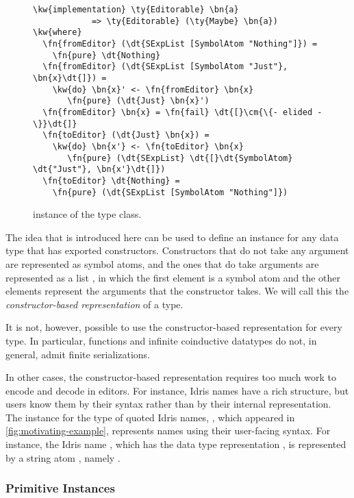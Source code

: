 \begin{figure}[H]
\begin{Verbatim}
\kw{implementation} \ty{Editorable} \bn{a}
            => \ty{Editorable} (\ty{Maybe} \bn{a}) \kw{where}
  \fn{fromEditor} (\dt{SExpList [SymbolAtom "Nothing"]}) =
    \fn{pure} \dt{Nothing}
  \fn{fromEditor} (\dt{SExpList [SymbolAtom "Just"}, \bn{x}\dt{]}) =
    \kw{do} \bn{x}' <- \fn{fromEditor} \bn{x}
       \fn{pure} (\dt{Just} \bn{x}')
  \fn{fromEditor} \bn{x} = \fn{fail} \dt{[}\cm{\{- elided -\}}\dt{]}
  \fn{toEditor} (\dt{Just} \bn{x}) =
    \kw{do} \bn{x'} <- \fn{toEditor} \bn{x}
       \fn{pure} (\dt{SExpList} \dt{[}\dt{SymbolAtom} \dt{"Just"}, \bn{x'}\dt{]})
  \fn{toEditor} \dt{Nothing} =
    \fn{pure} (\dt{SExpList [SymbolAtom "Nothing"]})
\end{Verbatim}
\label{code:editorableMaybe}
\caption{ instance of the  type class.}
\end{figure}

The idea that is introduced here can be used to define an \Editorable{}
instance for any data type that has exported constructors. Constructors that do
not take any argument are represented as symbol atoms, and the ones that do
take arguments are represented as a list \sexp{}, in which the first element is
a symbol atom and the other elements represent the arguments that the
constructor takes. We will call this the \emph{constructor-based \sexp{}
representation} of a type.

It is not, however, possible to use the constructor-based representation for every type.
In particular, functions and infinite coinductive datatypes do not, in general, admit finite serializations.

In other cases, the constructor-based representation requires too much work to encode and decode in editors.
For instance, Idris names have a rich structure, but users know them by their syntax rather than by their internal representation.
The \Editorable{} instance for the type of quoted Idris
names, , which appeared in \autoref{fig:motivating-example}, represents names using their user-facing syntax.
For instance, the Idris name , which has the
data type representation , is
represented by a string atom \sexp{}, namely .

\subsubsection{Primitive \Editorable{} Instances}
\label{sssec:primitiveEditorable}

